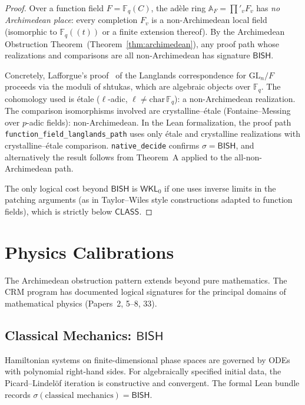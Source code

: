 \documentclass[11pt,a4paper]{article}
\theoremstyle{plain}
\theoremstyle{definition}
\newcommand{\BISH}{\textsf{BISH}}
\newcommand{\WKL}{\textsf{WKL}_0}
\newcommand{\CLASS}{\textsf{CLASS}}
\newcommand{\sig}{\sigma}
\newcommand{\F}{\mathbb{F}}
\newcommand{\A}{\mathbb{A}}
\newcommand{\GL}{\mathrm{GL}}
\begin{document}
\begin{proof}
Over a function field $F = \F_q(C)$, the ad\`ele ring $\A_F = \prod'_v F_v$ has \emph{no Archimedean place}: every completion $F_v$ is a non-Archimedean local field (isomorphic to $\F_q(\!(t)\!)$ or a finite extension thereof). By the Archimedean Obstruction Theorem~(Theorem~\ref{thm:archimedean}), any proof path whose realizations and comparisons are all non-Archimedean has signature $\BISH$.

Concretely, Lafforgue's proof~\cite{lafforgue02} of the Langlands correspondence for $\GL_n/F$ proceeds via the moduli of shtukas, which are algebraic objects over $\F_q$. The cohomology used is \'etale ($\ell$-adic, $\ell \neq \mathrm{char}\, \F_q$): a non-Archimedean realization. The comparison isomorphisms involved are crystalline--\'etale (Fontaine--Messing over $p$-adic fields): non-Archimedean. In the Lean formalization, the proof path \texttt{function\_field\_langlands\_path} uses only \'etale and crystalline realizations with crystalline--\'etale comparison. \texttt{native\_decide} confirms $\sig = \BISH$, and alternatively the result follows from Theorem~A applied to the all-non-Archimedean path.

The only logical cost beyond $\BISH$ is $\WKL$ if one uses inverse limits in the patching arguments (as in Taylor--Wiles style constructions adapted to function fields), which is strictly below $\CLASS$.
\end{proof}


\section{Physics Calibrations}\label{sec:physics}

The Archimedean obstruction pattern extends beyond pure mathematics. The CRM program has documented logical signatures for the principal domains of mathematical physics (Papers~2, 5--8, 33).

\subsection{Classical Mechanics: $\BISH$}

Hamiltonian systems on finite-dimensional phase spaces are governed by ODEs with polynomial right-hand sides. For algebraically specified initial data, the Picard--Lindel\"of iteration is constructive and convergent. The formal Lean bundle records $\sig(\text{classical mechanics}) = \BISH$.
\end{document}
